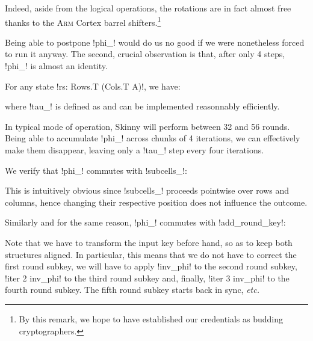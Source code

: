 \documentclass[draft,english]{jflart}
\newcommand{\etc}{\textit{etc.}}
\begin{document}
Indeed, aside from the logical operations, the rotations are in fact
almost free thanks to the \textsc{Arm} Cortex barrel
shifters.\footnote{By this remark, we hope to have established our
credentials as budding cryptographers.}


Being able to postpone \coqe!phi_! would do us no good if we were
nonetheless forced to run it anyway. The second, crucial observation
is that, after only 4 steps, \coqe!phi_! is almost an identity.

\begin{prop}
  For any state \coqe!rs: Rows.T (Cols.T A)!, we have:

  where \coqe!tau_! is defined as
  and can be implemented reasonnably efficiently.
\end{prop}

In typical mode of operation, Skinny will perform between 32 and 56
rounds. Being able to accumulate \coqe!phi_! across chunks of 4
iterations, we can effectively make them disappear, leaving only a
\coqe!tau_! step every four iterations.


We verify that \coqe!phi_! commutes with \coqe!subcells_!:
%
\begin{prop}
\end{prop}

This is intuitively obvious since \coqe!subcells_! proceeds pointwise
over rows and columns, hence changing their respective position does
not influence the outcome.


Similarly and for the same reason, \coqe!phi_! commutes with
\coqe!add_round_key!:
%
\begin{prop}
\end{prop}

Note that we have to transform the input key before hand, so as to
keep both structures aligned. In particular, this means that we do not
have to correct the first round subkey, we will have to apply
\coqe!inv_phi! to the second round subkey, \coqe!iter 2 inv_phi! to
the third round subkey and, finally, \coqe!iter 3 inv_phi! to the
fourth round subkey. The fifth round subkey starts back in sync,
\etc{}
\end{document}
